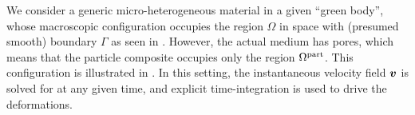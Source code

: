 \documentclass[MikaelDissertation.tex]{subfiles}
\begin{document}
We consider a generic micro-heterogeneous material in a given ``green body'', whose macroscopic configuration occupies the region $\Omega$ in space with (presumed smooth) boundary $\Gamma$ as seen in .
However, the actual medium has pores, which means that the particle composite occupies only the region $\Omega^{\mathrm{part}}$.
This configuration is illustrated in .
In this setting, the instantaneous velocity field $\boldsymbol{v}$ is solved for at any given time, and explicit time-integration is used to drive the deformations.
\end{document}
